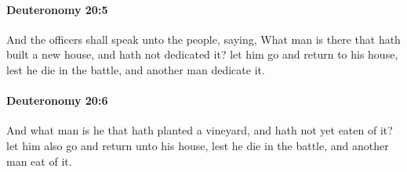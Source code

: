 		\paragraph{Deuteronomy 20:5} %
			\label{DEUTERONOMY-20-5}

			And the officers shall speak unto the people, saying, What man is there that hath built a new house, and hath not dedicated it? let him go and return to his house, lest he die in the battle, and another man dedicate it.


		\paragraph{Deuteronomy 20:6} %
			\label{DEUTERONOMY-20-6}

			And what man is he that hath planted a vineyard, and hath not yet eaten of it? let him also go and return unto his house, lest he die in the battle, and another man eat of it.

